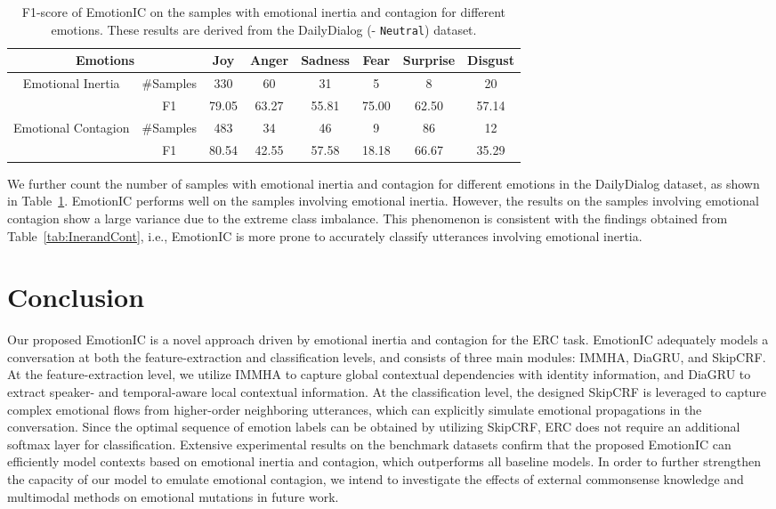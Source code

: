 \documentclass{SCIS2019}
\begin{document}
\begin{table}[htbp]
\caption{F1-score of EmotionIC on the samples with emotional inertia and contagion for different emotions. These results are derived from the DailyDialog (- \texttt{Neutral}) dataset.}
\label{tab:InerandCont_DD}	
\begin{center}
\renewcommand{\arraystretch}{1.0}
\setlength{\tabcolsep}{8.5pt}
\begin{tabular}{c|c|cccccc}
\toprule
\multicolumn{2}{c|}{Emotions} &  Joy & Anger & Sadness & Fear & Surprise & Disgust\\ 
\cline{2-5}
\hline
\multirow{2}{*}{Emotional Inertia} &\#Samples &330 & 60 & 31 &5 &8 &20\\
							& F1&79.05 &63.27 &55.81 &75.00 &62.50 &57.14 \\
\hline
\multirow{2}{*}{Emotional Contagion} &\#Samples &483 &34 &46 &9 &86 &12\\
							& F1&80.54 &42.55 &57.58 &18.18 &66.67 &35.29\\
\bottomrule
\end{tabular}
\end{center}
\end{table}
We further count the number of samples with emotional inertia and contagion for different emotions in the DailyDialog dataset, as shown in Table~\ref{tab:InerandCont_DD}. EmotionIC performs well on the samples involving emotional inertia. However, the results on the samples involving emotional contagion show a large variance due to the extreme class imbalance. This phenomenon is consistent with the findings obtained from Table~\ref{tab:InerandCont}, i.e., EmotionIC is more prone to accurately classify utterances involving emotional inertia.

\section{Conclusion}\label{sec:conclusion}
Our proposed EmotionIC is a novel approach driven by emotional inertia and contagion for the ERC task. EmotionIC adequately models a conversation at both the feature-extraction and classification levels, and consists of three main modules: IMMHA, DiaGRU, and SkipCRF. At the feature-extraction level, we utilize IMMHA to capture global contextual dependencies with identity information, and DiaGRU to extract speaker- and temporal-aware local contextual information. At the classification level, the designed SkipCRF is leveraged to capture complex emotional flows from higher-order neighboring utterances, which can explicitly simulate emotional propagations in the conversation. Since the optimal sequence of emotion labels can be obtained by utilizing SkipCRF, ERC does not require an additional softmax layer for classification. Extensive experimental results on the benchmark datasets confirm that the proposed EmotionIC can efficiently model contexts based on emotional inertia and contagion, which outperforms all baseline models. In order to further strengthen the capacity of our model to emulate emotional contagion, we intend to investigate the effects of external commonsense knowledge and multimodal methods on emotional mutations in future work.
\end{document}
